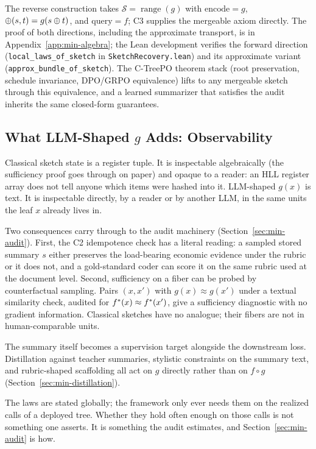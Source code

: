 The reverse construction takes $\mathcal{S}=\operatorname{range}(g)$
with $\mathrm{encode}=g$, $\oplus(s,t)=g(s\oplus t)$, and
$\mathrm{query}=f$; C3 supplies the mergeable axiom directly. The
proof of both directions, including the approximate transport, is in
Appendix~\ref{app:min-algebra}; the Lean development verifies the
forward direction (\texttt{local\_laws\_of\_sketch} in
\texttt{SketchRecovery.lean}) and its approximate variant
(\texttt{approx\_bundle\_of\_sketch}). The C-TreePO theorem stack
(root preservation, schedule invariance, DPO/GRPO equivalence) lifts
to any mergeable sketch through this equivalence, and a learned
summarizer that satisfies the audit inherits the same closed-form
guarantees.

\subsection{What LLM-Shaped $g$ Adds: Observability}\label{sec:min-observability}

Classical sketch state is a register tuple. It is inspectable
algebraically (the sufficiency proof goes through on paper) and opaque
to a reader: an HLL register array does not tell anyone which items
were hashed into it. LLM-shaped $g(x)$ is text. It is inspectable
directly, by a reader or by another LLM, in the same units the leaf
$x$ already lives in.

Two consequences carry through to the audit machinery
(Section~\ref{sec:min-audit}). First, the C2 idempotence check has a
literal reading: a sampled stored summary $s$ either preserves the
load-bearing economic evidence under the rubric or it does not, and a
gold-standard coder can score it on the same rubric used at the
document level. Second, sufficiency on a fiber can be probed by
counterfactual sampling. Pairs $(x, x')$ with $g(x)\approx g(x')$
under a textual similarity check, audited for
$f^\ast(x)\approx f^\ast(x')$, give a sufficiency diagnostic with no
gradient information. Classical sketches have no analogue; their
fibers are not in human-comparable units.

The summary itself becomes a supervision target alongside the
downstream loss. Distillation against teacher summaries, stylistic
constraints on the summary text, and rubric-shaped scaffolding all act
on $g$ directly rather than on $f\circ g$
(Section~\ref{sec:min-distillation}).

The laws are stated globally; the framework only ever needs them on the
realized calls of a deployed tree. Whether they hold often enough on
those calls is not something one asserts. It is something the audit
estimates, and Section~\ref{sec:min-audit} is how.
